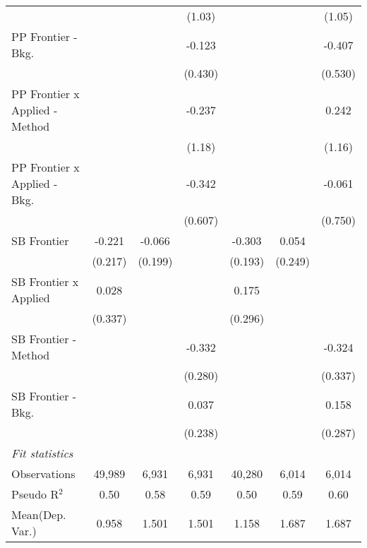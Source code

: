 \begin{tabular}{lcccccc}
                                  &                &                & (1.03)         &                &                & (1.05)\\   
   PP Frontier - Bkg.             &                &                & -0.123         &                &                & -0.407\\   
                                  &                &                & (0.430)        &                &                & (0.530)\\   
   PP Frontier x Applied - Method &                &                & -0.237         &                &                & 0.242\\   
                                  &                &                & (1.18)         &                &                & (1.16)\\   
   PP Frontier x Applied - Bkg.   &                &                & -0.342         &                &                & -0.061\\   
                                  &                &                & (0.607)        &                &                & (0.750)\\   
   SB Frontier                    & -0.221         & -0.066         &                & -0.303         & 0.054          &   \\   
                                  & (0.217)        & (0.199)        &                & (0.193)        & (0.249)        &   \\   
   SB Frontier x Applied          & 0.028          &                &                & 0.175          &                &   \\   
                                  & (0.337)        &                &                & (0.296)        &                &   \\   
   SB Frontier - Method           &                &                & -0.332         &                &                & -0.324\\   
                                  &                &                & (0.280)        &                &                & (0.337)\\   
   SB Frontier - Bkg.             &                &                & 0.037          &                &                & 0.158\\   
                                  &                &                & (0.238)        &                &                & (0.287)\\   
   \midrule
   \emph{Fit statistics}\\
   Observations                   & 49,989         & 6,931          & 6,931          & 40,280         & 6,014          & 6,014\\  
   Pseudo R$^2$                   & 0.50           & 0.58           & 0.59           & 0.50           & 0.59           & 0.60\\  
Mean(Dep. Var.) & 0.958 & 1.501 & 1.501 & 1.158 & 1.687 & 1.687 \\
   

\end{tabular}
